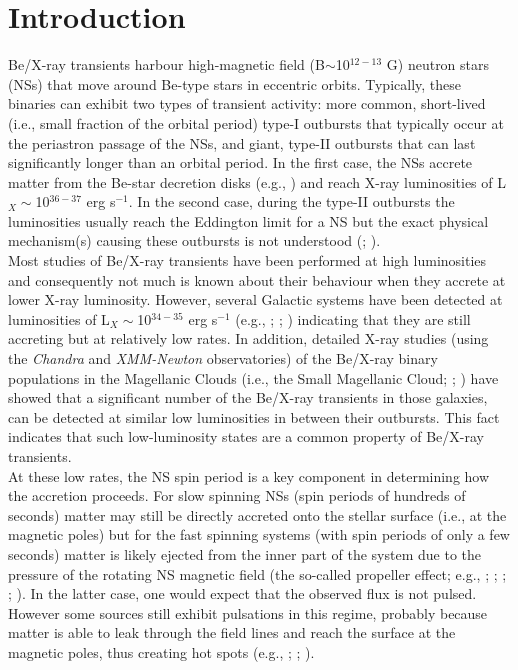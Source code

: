 \documentclass[a4paper,fleqn,usenatbib]{mnras}
\begin{document}
\section{Introduction}\label{sec:introduction}
Be/X-ray transients harbour high-magnetic field (B$\sim$10$^{12-13}$ G) neutron stars (NSs) that move around Be-type stars in eccentric orbits. Typically, these binaries can exhibit two types of transient activity: more common, short-lived (i.e., small fraction of the orbital period) type-I outbursts that typically occur at the periastron passage of the NSs, and giant, type-II outbursts that can last significantly longer than an orbital period. In the first case, the NSs accrete matter from the Be-star decretion disks (e.g., \citealt{Okazaki2001}) and reach X-ray luminosities of L$_{X}\sim$10$^{36-37}$ erg s$^{-1}$. In the second case, during the type-II outbursts the luminosities usually reach the Eddington limit for a NS but the exact physical mechanism(s) causing these outbursts is not understood (\citealt{Moritani2013}; \citealt{Monageng2017}).\\
\indent Most studies of Be/X-ray transients have been performed at high luminosities \citep[i.e., $>$10$^{36}$ erg s$^{-1}$; e.g., see the review by][]{Reig2011} and consequently not much is known about their behaviour when they accrete at lower X-ray luminosity. However, several Galactic systems have been detected at luminosities of L$_{X}\sim$10$^{34-35}$ erg s$^{-1}$ (e.g., \citealt{Motch1991}; \citealt{Campana2002}; \citealt{Rutledge2007}) indicating that they are still accreting but at relatively low rates. In addition, detailed X-ray studies (using the \textit{Chandra} and \textit{XMM-Newton} observatories) of the Be/X-ray binary populations in the Magellanic Clouds (i.e., the Small Magellanic Cloud; \citealt{Laycock2010}; \citealt{Haberl2016}) have showed that a significant number of the Be/X-ray transients in those galaxies, can be detected at similar low luminosities in between their outbursts. This fact indicates that such low-luminosity states are a common property of Be/X-ray transients.\\
\indent At these low rates, the NS spin period is a key component in determining how the accretion proceeds. For slow spinning NSs (spin periods of hundreds of seconds) matter may still be directly accreted onto the stellar surface (i.e., at the magnetic poles) but for the fast spinning systems (with spin periods of only a few seconds) matter is likely ejected from the inner part of the system due to the pressure of the rotating NS magnetic field (the so-called propeller effect; e.g., \citealt{Illarionov1975}; \citealt{Stella1986}; \citealt{Romanova2004}; \citealt{DAngelo2010}; \citealt{Tsygankov2016}). In the latter case, one would expect that the observed flux is not pulsed. However some sources still exhibit pulsations in this regime, probably because matter is able to leak through the field lines and reach the surface at the magnetic poles, thus creating hot spots (e.g., \citealt{Elsner1977}; \citealt{Ikhsanov2001}; \citealt{Lii2014}).\\
\end{document}
